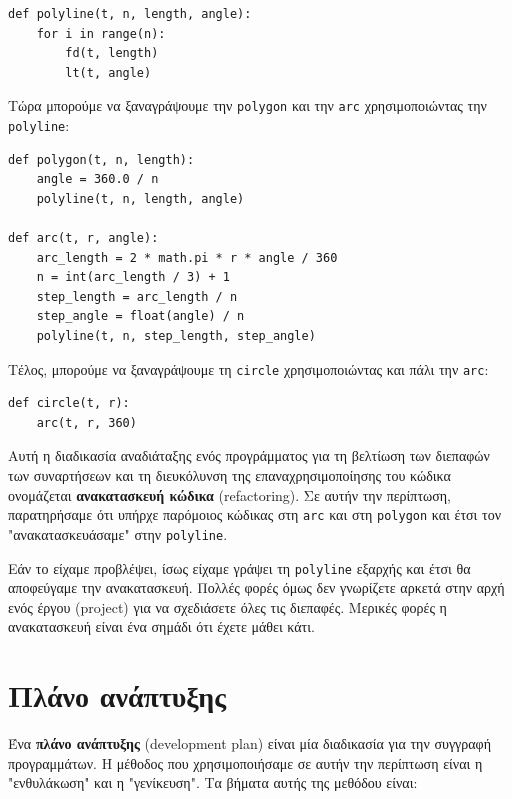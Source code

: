 \documentclass[10pt]{book}
\begin{document}
\begin{verbatim}
def polyline(t, n, length, angle):
    for i in range(n):
        fd(t, length)
        lt(t, angle)
\end{verbatim}
%

Τώρα μπορούμε να ξαναγράψουμε την {\tt polygon} και την {\tt arc} χρησιμοποιώντας την {\tt polyline}:

\begin{verbatim}
def polygon(t, n, length):
    angle = 360.0 / n
    polyline(t, n, length, angle)

def arc(t, r, angle):
    arc_length = 2 * math.pi * r * angle / 360
    n = int(arc_length / 3) + 1
    step_length = arc_length / n
    step_angle = float(angle) / n
    polyline(t, n, step_length, step_angle)
\end{verbatim}
%

Τέλος, μπορούμε να ξαναγράψουμε τη {\tt circle} χρησιμοποιώντας και πάλι την {\tt arc}:

\begin{verbatim}
def circle(t, r):
    arc(t, r, 360)
\end{verbatim}
%

Αυτή η διαδικασία αναδιάταξης ενός προγράμματος για τη βελτίωση των διεπαφών των συναρτήσεων και τη διευκόλυνση της επαναχρησιμοποίησης του κώδικα ονομάζεται {\bf ανακατασκευή κώδικα} (refactoring). Σε αυτήν την περίπτωση, παρατηρήσαμε ότι υπήρχε παρόμοιος κώδικας στη {\tt arc} και στη 
{\tt polygon} και έτσι τον "ανακατασκευάσαμε" στην {\tt polyline}.


Εάν το είχαμε προβλέψει, ίσως είχαμε γράψει τη {\tt polyline} εξαρχής και έτσι θα αποφεύγαμε την ανακατασκευή. Πολλές φορές όμως δεν γνωρίζετε αρκετά στην αρχή ενός έργου (project) για να σχεδιάσετε όλες τις διεπαφές. Μερικές φορές η ανακατασκευή είναι ένα σημάδι ότι έχετε μάθει κάτι.


\section{Πλάνο ανάπτυξης}

Ένα {\bf πλάνο ανάπτυξης} (development plan) είναι μία διαδικασία για την συγγραφή προγραμμάτων. Η μέθοδος που χρησιμοποιήσαμε σε αυτήν την περίπτωση είναι η "ενθυλάκωση" και η  "γενίκευση". Τα βήματα αυτής της μεθόδου είναι:
\end{document}
